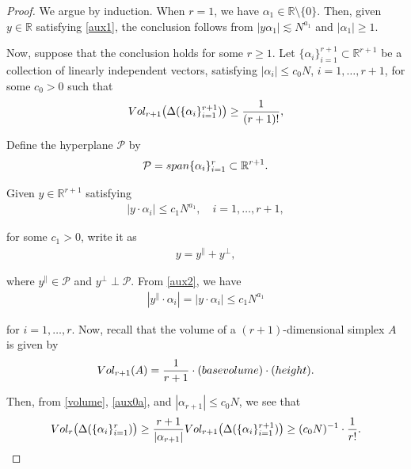 \documentclass[10pt,a4paper]{amsart}
\newcommand{\Dl}{\Delta}
\newcommand{\R}{\mathbb{R}}
\newcommand{\al}{\alpha}
\newcommand{\les}{\lesssim}
\newcommand{\noi}{\noindent}
\begin{document}
\begin{proof}
We argue by induction.
When $r = 1$, we have  $\al_1 \in \R\setminus\{0\}$.
Then, 
given $y \in\R$ satisfying \eqref{aux1}, 
the conclusion follows from $|y \al_1| \les N^{a_1}$ and $|\al_1| \ge 1$.

Now, suppose that the conclusion holds for some $r \ge 1$.
 Let $\{\al_i \}_{i=1}^{r+1} \subset \R^{r+1}$ be a collection of linearly independent  vectors, 
  satisfying 
$ |\al_i| \le c_0  N$, $i = 1, \dots, r+1$, 
for some $c_0 > 0$
such that 
\begin{align}
\textup{Vol}_{r+1}
\big(\Dl(\{\al_i\}_{i = 1}^{r+1})\big) \ge \frac 1{(r+1)!}, 
\label{aux0a}
\end{align}


 
\noi
Define the hyperplane $\mathcal{P}$ by 
\[
\mathcal P = {\rm span} \{\al_i \}_{i=1}^r \subset \R^{r+1}.
\]

\noi
Given  $y \in \R^{r+1}$ satisfying
\begin{align}
|y \cdot \al_i| \le c_1 N^{a_1}, \quad i = 1, \dots, r+1, 
\label{aux2}
\end{align}

\noi
for some $c_1 > 0$, 
write it as 
\begin{align*}
y = y^\parallel + y^\perp,
\end{align*}



\noi
where $y^\parallel \in \mathcal P$ and $ y^\perp \perp \mathcal P$.
From \eqref{aux2}, we have
\begin{align}
|y^\parallel \cdot \al_i | = |y \cdot \al_i | \le c_1 N^{a_1}
\label{aux0b}
\end{align}



\noi
for $i = 1, \dots, r$.
Now, 
 recall that the volume of a $(r+1)$-dimensional simplex $A$ is given by 
\begin{align}\label{volume}
\textup{Vol}_{r+1}(A)
= 
 \frac1{r+1} \cdot (\textup{base volume}) \cdot (\textup{height}).
\end{align}


\noi
Then, 
from \eqref{volume}, \eqref{aux0a},  and $|\al_{r+1}|\le c_0 N$, we see that 
\begin{align*}
\textup{Vol}_r
\big(\Dl(\{\al_i\}_{i = 1}^r)\big) \ge 
\frac{r+1}{|\al_{r+1}|}
\textup{Vol}_{r+1}
\big(\Dl(\{\al_i\}_{i = 1}^{r+1})\big) \ge (c_0N)^{-1}\cdot \frac 1 {r!}.
\end{align*}



\end{proof}
\end{document}
